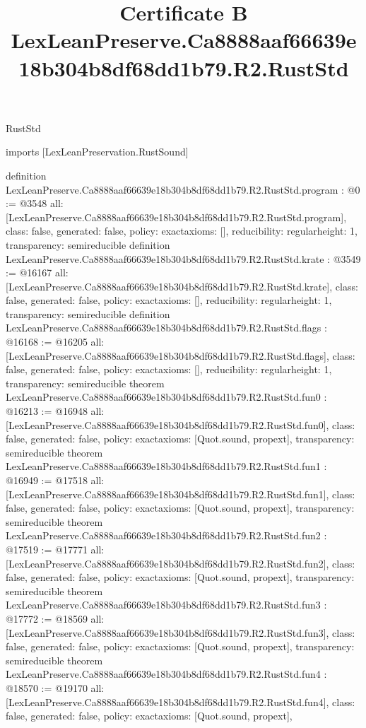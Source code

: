 \begin{lexlean}{RustStd}
\title{Certificate B LexLeanPreserve.Ca8888aaf66639e18b304b8df68dd1b79.R2.RustStd}
\begin{coremodule}
imports [LexLeanPreservation.RustSound]

definition LexLeanPreserve.Ca8888aaf66639e18b304b8df68dd1b79.R2.RustStd.program : @0 := @3548 {
  all: [LexLeanPreserve.Ca8888aaf66639e18b304b8df68dd1b79.R2.RustStd.program],
  class: false,
  generated: false,
  policy: exact{axioms: []},
  reducibility: regular{height: 1},
  transparency: semireducible
}
definition LexLeanPreserve.Ca8888aaf66639e18b304b8df68dd1b79.R2.RustStd.krate : @3549 := @16167 {
  all: [LexLeanPreserve.Ca8888aaf66639e18b304b8df68dd1b79.R2.RustStd.krate],
  class: false,
  generated: false,
  policy: exact{axioms: []},
  reducibility: regular{height: 1},
  transparency: semireducible
}
definition LexLeanPreserve.Ca8888aaf66639e18b304b8df68dd1b79.R2.RustStd.flags : @16168 := @16205 {
  all: [LexLeanPreserve.Ca8888aaf66639e18b304b8df68dd1b79.R2.RustStd.flags],
  class: false,
  generated: false,
  policy: exact{axioms: []},
  reducibility: regular{height: 1},
  transparency: semireducible
}
theorem LexLeanPreserve.Ca8888aaf66639e18b304b8df68dd1b79.R2.RustStd.fun0 : @16213 := @16948 {
  all: [LexLeanPreserve.Ca8888aaf66639e18b304b8df68dd1b79.R2.RustStd.fun0],
  class: false,
  generated: false,
  policy: exact{axioms: [Quot.sound, propext]},
  transparency: semireducible
}
theorem LexLeanPreserve.Ca8888aaf66639e18b304b8df68dd1b79.R2.RustStd.fun1 : @16949 := @17518 {
  all: [LexLeanPreserve.Ca8888aaf66639e18b304b8df68dd1b79.R2.RustStd.fun1],
  class: false,
  generated: false,
  policy: exact{axioms: [Quot.sound, propext]},
  transparency: semireducible
}
theorem LexLeanPreserve.Ca8888aaf66639e18b304b8df68dd1b79.R2.RustStd.fun2 : @17519 := @17771 {
  all: [LexLeanPreserve.Ca8888aaf66639e18b304b8df68dd1b79.R2.RustStd.fun2],
  class: false,
  generated: false,
  policy: exact{axioms: [Quot.sound, propext]},
  transparency: semireducible
}
theorem LexLeanPreserve.Ca8888aaf66639e18b304b8df68dd1b79.R2.RustStd.fun3 : @17772 := @18569 {
  all: [LexLeanPreserve.Ca8888aaf66639e18b304b8df68dd1b79.R2.RustStd.fun3],
  class: false,
  generated: false,
  policy: exact{axioms: [Quot.sound, propext]},
  transparency: semireducible
}
theorem LexLeanPreserve.Ca8888aaf66639e18b304b8df68dd1b79.R2.RustStd.fun4 : @18570 := @19170 {
  all: [LexLeanPreserve.Ca8888aaf66639e18b304b8df68dd1b79.R2.RustStd.fun4],
  class: false,
  generated: false,
  policy: exact{axioms: [Quot.sound, propext]},
}
\end{coremodule}
\end{lexlean}

